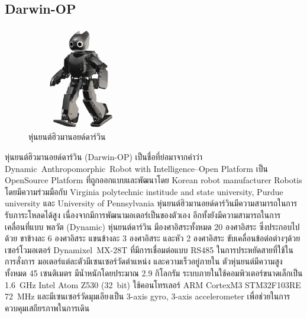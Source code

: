 \clearpage
\subsection*{Darwin-OP}
\begin{figure}[htbp]
    \centering
    \includegraphics[width=0.4\textwidth]{chapter2/images/Darwin_OP_6.jpg}
    \caption{หุ่นยนต์ฮิวมานอยด์ดาร์วิน}
    \label{fig:darwin_humanoid}
\end{figure}
\hspace*{10mm} หุ่นยนต์ฮิวมานอยด์ดาร์วิน (Darwin-OP) เป็นชื่อที่ย่อมาจากคำว่า Dynamic Anthropomorphic Robot
with Intelligence–Open Platform
เป็น OpenSource Platform ที่ถูกออกแบบและพัฒนาโดย Korean robot manufacturer Robotis
โดยมีความร่วมมือกับ Virginia polytechnic institude and state university, Purdue university และ University of Pennsylvania
หุ่นยนต์ฮิวมานอยด์ดาร์วินมีความสามารถในการรับภาระโหลดได้สูง เนื่องจากมีการพัฒนามอเตอร์เป็นของตัวเอง อีกทั้งยังมีความสามารถในการเคลื่อนที่แบบ
พลวัต (Dynamic) หุ่นยนต์ดาร์วิน มีองศาอิสระทั้งหมด 20 องศาอิสระ ซึ่งประกอบไปด้วย ขาข้างละ 6 องศาอิสระ แขนข้างละ 3 องศาอิสระ และหัว 2 องศาอิสระ
ขับเคลื่อนข้อต่อต่างๆด้วยเซอร์โวมอเตอร์ Dynamixel MX-28T ที่มีการเชื่อมต่อแบบ RS485 ในการประหยัดสายที่ใช้ในการสั่งการ มอเตอร์แต่ละตัวมีเซนเซอร์วัดตำแหน่ง 
และความเร็วอยู่ภายใน ตัวหุ่นยนต์มีความสูงทั้งหมด 45 เซนติเมตร มีน้ำหนักโดยประมาณ 2.9 กิโลกรัม
ระบบภายในใช้คอมพิวเตอร์ขนาดเล็กเป็น 1.6 GHz Intel Atom Z530 (32 bit) ใช้คอนโทรเลอร์ ARM CortexM3 STM32F103RE 72 MHz 
และมีเซนเซอร์วัดมุมเอียงเป็น 3-axis gyro, 3-axis accelerometer เพื่อช่วยในการควบคุมเสถียรภาพในการเดิน

\clearpage
